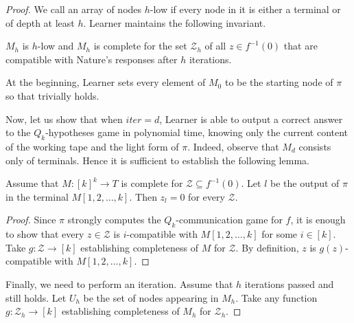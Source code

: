 \begin{proof}
We call an array of nodes $h$-low if every node in it is either a terminal or of depth at least $h$. Learner maintains the following invariant.
 

\begin{invariant}
\label{invar2}
$M_h$ is $h$-low and $M_h$ is complete for the set $\mathcal{Z}_h$ of all $z\in f^{-1}(0)$ that are compatible with Nature's responses after $h$ iterations.
\end{invariant}

At the beginning, Learner sets every element of  $M_0$ to be the starting node of $\pi$ so that  trivially holds.

Now, let us show that when $iter = d$, Learner is able to output a correct answer to the $Q_k$-hypotheses game in polynomial time, knowing only the current content of the working tape and the light form of $\pi$. Indeed, observe that $M_d$ consists only of terminals. Hence it is sufficient to establish the following lemma.

\begin{lemma}
\label{complete_lemma_2}
Assume that $M\colon [k]^k \to T$ is complete for $\mathcal{Z}\subseteq f^{-1}(0)$. Let $l$ be the output of $\pi$ in the terminal $M[1, 2, \ldots, k]$. Then $z_l = 0$ for every $\mathcal{Z}$.
\end{lemma}
\begin{proof}
Since $\pi$ strongly computes the $Q_k$-communication game for $f$, it is enough to show that every $z\in\mathcal{Z}$ is $i$-compatible with $M[1, 2, \ldots, k]$ for some $i\in[k]$. Take $g\colon \mathcal{Z} \to [k]$ establishing completeness of $M$ for $\mathcal{Z}$. By definition, $z$ is $g(z)$-compatible with $M[1, 2, \ldots, k]$.
\end{proof}

Finally, we need to perform an iteration. Assume that $h$ iterations passed and  still holds. Let $U_h$ be the set of nodes appearing in $M_h$. Take any function $g\colon \mathcal{Z}_h \to [k]$ establishing completeness of $M_h$ for $\mathcal{Z}_h$.


\end{proof}
